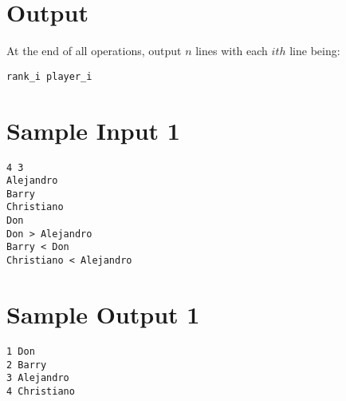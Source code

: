 \section*{Output}

At the end of all operations, output $n$ lines with each $ith$ line being:
\begin{lstlisting}
rank_i player_i
\end{lstlisting}

\section*{Sample Input 1}

\begin{verbatim}
4 3
Alejandro
Barry
Christiano
Don
Don > Alejandro
Barry < Don
Christiano < Alejandro
\end{verbatim}

\section*{Sample Output 1}

\begin{verbatim}
1 Don
2 Barry
3 Alejandro
4 Christiano
\end{verbatim}
